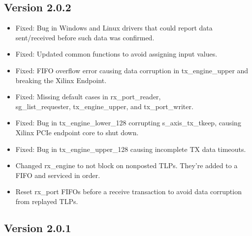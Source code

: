 \documentclass{refrep}
\begin{document}
\subsection{Version 2.0.2}
\begin{itemize}

\item Fixed: Bug in Windows and Linux drivers that could report data sent/received 
  before such data was confirmed.
\item Fixed: Updated common functions to avoid assigning input values.
\item Fixed: FIFO overflow error causing data corruption in tx\_engine\_upper and
  breaking the Xilinx Endpoint.
\item Fixed: Missing default cases in rx\_port\_reader, \\
  sg\_list\_requester, tx\_engine\_upper, and tx\_port\_writer.
\item Fixed: Bug in tx\_engine\_lower\_128 corrupting s\_axis\_tx\_tkeep, causing Xilinx
  PCIe endpoint core to shut down.
\item Fixed: Bug in tx\_engine\_upper\_128 causing incomplete TX data timeouts.
\item Changed rx\_engine to not block on nonposted TLPs. They're added to a FIFO and
  serviced in order. 
\item Reset rx\_port FIFOs before a receive transaction to avoid data corruption from
  replayed TLPs.
\end{itemize}

\subsection{Version 2.0.1}
\end{document}
